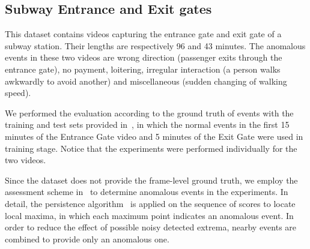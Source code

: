 \documentclass[10pt,twocolumn,letterpaper]{article}
\begin{document}
\subsection{Subway Entrance and Exit gates}
This dataset contains videos capturing the entrance gate and exit gate of a subway station. Their lengths are respectively 96 and 43 minutes. The anomalous events in these two videos are wrong direction (\eg passenger exits through the entrance gate), no payment, loitering, irregular interaction (\eg a person walks awkwardly to avoid another) and miscellaneous (\eg sudden changing of walking speed).

We performed the evaluation according to the ground truth of events with the training and test sets provided in~\cite{Kim2009Observe}, in which the normal events in the first 15 minutes of the Entrance Gate video and 5 minutes of the Exit Gate were used in training stage. Notice that the experiments were performed individually for the two videos.

Since the dataset does not provide the frame-level ground truth, we employ the assessment scheme in~\cite{Hasan2016Learning} to determine anomalous events in the experiments. In detail, the persistence algorithm~\cite{persistence1d} is applied on the sequence of scores to locate local maxima, in which each maximum point indicates an anomalous event. In order to reduce the effect of possible noisy detected extrema, nearby events are combined to provide only an anomalous one.
\end{document}
